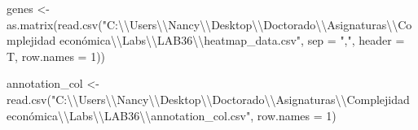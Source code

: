 \documentclass[
]{article}
\newenvironment{Shaded}{\begin{snugshade}}{\end{snugshade}}
\newcommand{\AttributeTok}[1]{\textcolor[rgb]{0.77,0.63,0.00}{#1}}
\newcommand{\DecValTok}[1]{\textcolor[rgb]{0.00,0.00,0.81}{#1}}
\newcommand{\FunctionTok}[1]{\textcolor[rgb]{0.00,0.00,0.00}{#1}}
\newcommand{\NormalTok}[1]{#1}
\newcommand{\OtherTok}[1]{\textcolor[rgb]{0.56,0.35,0.01}{#1}}
\newcommand{\SpecialCharTok}[1]{\textcolor[rgb]{0.00,0.00,0.00}{#1}}
\newcommand{\StringTok}[1]{\textcolor[rgb]{0.31,0.60,0.02}{#1}}
\begin{document}
\begin{Shaded}
\begin{Highlighting}[]
\NormalTok{genes }\OtherTok{\textless{}{-}} \FunctionTok{as.matrix}\NormalTok{(}\FunctionTok{read.csv}\NormalTok{(}\StringTok{"C:}\SpecialCharTok{\textbackslash{}\textbackslash{}}\StringTok{Users}\SpecialCharTok{\textbackslash{}\textbackslash{}}\StringTok{Nancy}\SpecialCharTok{\textbackslash{}\textbackslash{}}\StringTok{Desktop}\SpecialCharTok{\textbackslash{}\textbackslash{}}\StringTok{Doctorado}\SpecialCharTok{\textbackslash{}\textbackslash{}}\StringTok{Asignaturas}\SpecialCharTok{\textbackslash{}\textbackslash{}}\StringTok{Complejidad económica}\SpecialCharTok{\textbackslash{}\textbackslash{}}\StringTok{Labs}\SpecialCharTok{\textbackslash{}\textbackslash{}}\StringTok{LAB36}\SpecialCharTok{\textbackslash{}\textbackslash{}}\StringTok{heatmap\_data.csv"}\NormalTok{,}
                            \AttributeTok{sep =} \StringTok{","}\NormalTok{,}
                            \AttributeTok{header =}\NormalTok{ T,}
                            \AttributeTok{row.names =} \DecValTok{1}\NormalTok{))}
\end{Highlighting}
\end{Shaded}

\begin{Shaded}
\begin{Highlighting}[]
\NormalTok{annotation\_col }\OtherTok{\textless{}{-}} \FunctionTok{read.csv}\NormalTok{(}\StringTok{"C:}\SpecialCharTok{\textbackslash{}\textbackslash{}}\StringTok{Users}\SpecialCharTok{\textbackslash{}\textbackslash{}}\StringTok{Nancy}\SpecialCharTok{\textbackslash{}\textbackslash{}}\StringTok{Desktop}\SpecialCharTok{\textbackslash{}\textbackslash{}}\StringTok{Doctorado}\SpecialCharTok{\textbackslash{}\textbackslash{}}\StringTok{Asignaturas}\SpecialCharTok{\textbackslash{}\textbackslash{}}\StringTok{Complejidad económica}\SpecialCharTok{\textbackslash{}\textbackslash{}}\StringTok{Labs}\SpecialCharTok{\textbackslash{}\textbackslash{}}\StringTok{LAB36}\SpecialCharTok{\textbackslash{}\textbackslash{}}\StringTok{annotation\_col.csv"}\NormalTok{,}
                           \AttributeTok{row.names =} \DecValTok{1}\NormalTok{)}
\end{Highlighting}
\end{Shaded}
\end{document}
